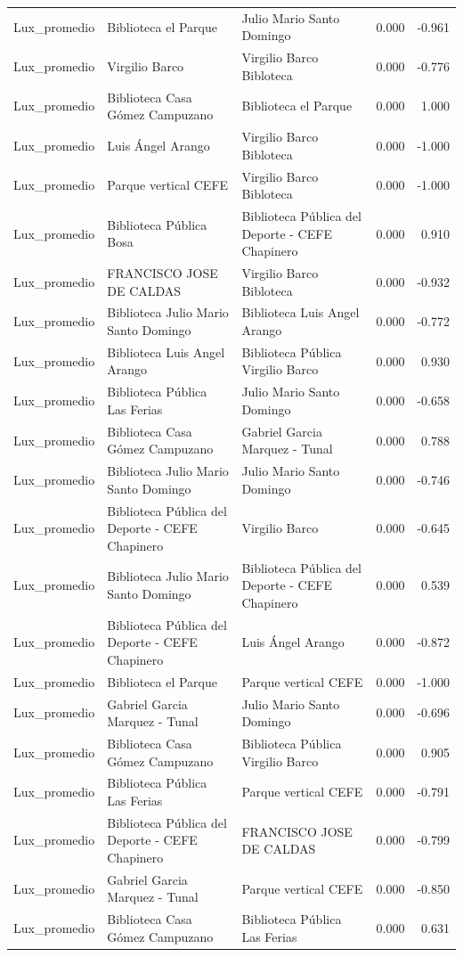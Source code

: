 \begin{tabular}{lllrr}
Lux\_promedio & Biblioteca el Parque & Julio Mario Santo Domingo & 0.000 & -0.961 \\
Lux\_promedio & Virgilio Barco & Virgilio Barco Bibloteca & 0.000 & -0.776 \\
Lux\_promedio & Biblioteca Casa Gómez Campuzano & Biblioteca el Parque & 0.000 & 1.000 \\
Lux\_promedio & Luis Ángel Arango & Virgilio Barco Bibloteca & 0.000 & -1.000 \\
Lux\_promedio & Parque vertical CEFE & Virgilio Barco Bibloteca & 0.000 & -1.000 \\
Lux\_promedio & Biblioteca Pública Bosa & Biblioteca Pública del Deporte - CEFE Chapinero & 0.000 & 0.910 \\
Lux\_promedio & FRANCISCO JOSE DE CALDAS & Virgilio Barco Bibloteca & 0.000 & -0.932 \\
Lux\_promedio & Biblioteca Julio Mario Santo Domingo & Biblioteca Luis Angel Arango & 0.000 & -0.772 \\
Lux\_promedio & Biblioteca Luis Angel Arango & Biblioteca Pública Virgilio Barco & 0.000 & 0.930 \\
Lux\_promedio & Biblioteca Pública Las Ferias & Julio Mario Santo Domingo & 0.000 & -0.658 \\
Lux\_promedio & Biblioteca Casa Gómez Campuzano & Gabriel Garcia Marquez - Tunal & 0.000 & 0.788 \\
Lux\_promedio & Biblioteca Julio Mario Santo Domingo & Julio Mario Santo Domingo & 0.000 & -0.746 \\
Lux\_promedio & Biblioteca Pública del Deporte - CEFE Chapinero & Virgilio Barco & 0.000 & -0.645 \\
Lux\_promedio & Biblioteca Julio Mario Santo Domingo & Biblioteca Pública del Deporte - CEFE Chapinero & 0.000 & 0.539 \\
Lux\_promedio & Biblioteca Pública del Deporte - CEFE Chapinero & Luis Ángel Arango & 0.000 & -0.872 \\
Lux\_promedio & Biblioteca el Parque & Parque vertical CEFE & 0.000 & -1.000 \\
Lux\_promedio & Gabriel Garcia Marquez - Tunal & Julio Mario Santo Domingo & 0.000 & -0.696 \\
Lux\_promedio & Biblioteca Casa Gómez Campuzano & Biblioteca Pública Virgilio Barco & 0.000 & 0.905 \\
Lux\_promedio & Biblioteca Pública Las Ferias & Parque vertical CEFE & 0.000 & -0.791 \\
Lux\_promedio & Biblioteca Pública del Deporte - CEFE Chapinero & FRANCISCO JOSE DE CALDAS & 0.000 & -0.799 \\
Lux\_promedio & Gabriel Garcia Marquez - Tunal & Parque vertical CEFE & 0.000 & -0.850 \\
Lux\_promedio & Biblioteca Casa Gómez Campuzano & Biblioteca Pública Las Ferias & 0.000 & 0.631 \\
\bottomrule
\end{tabular}
